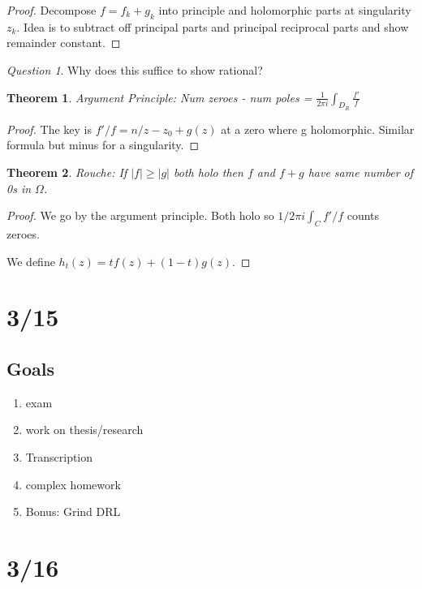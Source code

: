 \documentclass[11pt]{article}
\newtheorem{theorem}{Theorem}
\theoremstyle{remark}
\newtheorem{quest}{Question}
\begin{document}
\begin{proof}
	Decompose $f = f_k + g_k$ into principle and holomorphic parts at singularity $z_k$. Idea is to subtract off principal parts and principal reciprocal parts and show remainder constant. 
\end{proof}

\begin{quest}
	Why does this suffice to show rational?
\end{quest}

\begin{theorem}
	Argument Principle: Num zeroes - num poles = $\frac{1}{2 \pi i}\int_{D_R} \frac{f'}{f}$
\end{theorem}

\begin{proof}
	The key is $f'/f = n/z-z_0 + g(z)$ at a zero where g holomorphic. Similar formula but minus for a singularity. 
\end{proof}

\begin{theorem}
	Rouche: If $|f| \geq |g|$ both holo then $f$ and $f+g$ have same number of 0s in $\Omega$. 
\end{theorem}

\begin{proof}
	We go by the argument principle. Both holo so $1/2\pi i \int_C f'/f$ counts zeroes. 

	We define $h_t(z) = tf(z) +(1-t)g(z)$. 
\end{proof}

\section{3/15}

\subsection{Goals}

\begin{enumerate}
	\item exam
	\item work on thesis/research
	\item Transcription
	\item complex homework
	\item Bonus: Grind DRL
\end{enumerate}

\section{3/16}
\end{document}
